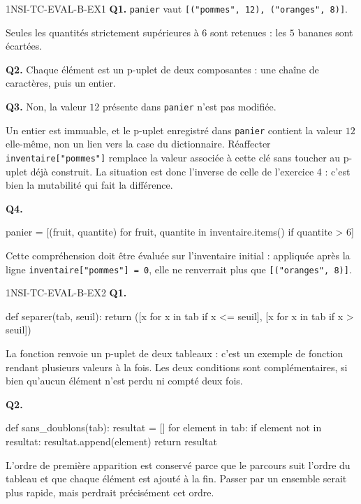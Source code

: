 \begin{corrige}{1NSI-TC-EVAL-B-EX1}
\textbf{Q1.} \lstinline{panier} vaut \lstinline{[("pommes", 12), ("oranges", 8)]}.

Seules les quantités strictement supérieures à $6$ sont retenues : les $5$ bananes sont écartées.

\textbf{Q2.} Chaque élément est un p-uplet de deux composantes : une chaîne de caractères, puis un entier.

\textbf{Q3.} Non, la valeur $12$ présente dans \lstinline{panier} n'est pas modifiée.

Un entier est immuable, et le p-uplet enregistré dans \lstinline{panier} contient la valeur $12$ elle-même, non un lien vers la case du dictionnaire. Réaffecter \lstinline{inventaire["pommes"]} remplace la valeur associée à cette clé sans toucher au p-uplet déjà construit. La situation est donc l'inverse de celle de l'exercice 4 : c'est bien la mutabilité qui fait la différence.

\textbf{Q4.}
\begin{python}
panier = [(fruit, quantite) for fruit, quantite in inventaire.items() if quantite > 6]
\end{python}
Cette compréhension doit être évaluée sur l'inventaire initial : appliquée après la ligne \lstinline{inventaire["pommes"] = 0}, elle ne renverrait plus que \lstinline{[("oranges", 8)]}.
\end{corrige}

\begin{corrige}{1NSI-TC-EVAL-B-EX2}
\textbf{Q1.}
\begin{python}
def separer(tab, seuil):
    return ([x for x in tab if x <= seuil], [x for x in tab if x > seuil])
\end{python}
La fonction renvoie un p-uplet de deux tableaux : c'est un exemple de fonction rendant plusieurs valeurs à la fois. Les deux conditions sont complémentaires, si bien qu'aucun élément n'est perdu ni compté deux fois.

\textbf{Q2.}
\begin{python}
def sans_doublons(tab):
    resultat = []
    for element in tab:
        if element not in resultat:
            resultat.append(element)
    return resultat
\end{python}
L'ordre de première apparition est conservé parce que le parcours suit l'ordre du tableau et que chaque élément est ajouté à la fin. Passer par un ensemble serait plus rapide, mais perdrait précisément cet ordre.
\end{corrige}

